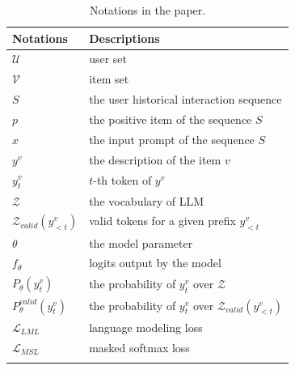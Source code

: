 \documentclass[sigconf,natbib=true]{acmart}
\begin{document}
\begin{table}[t]
    \centering
    \caption{Notations in the paper.}
    \begin{tabular}{ll}
    \toprule 
    \textbf{Notations}&\textbf{Descriptions}\\
    \midrule 
    $\mathcal{U}$ & user set \\
    $\mathcal{V}$ &  item set \\
    
    $S$ &  the user historical interaction sequence \\
    $p$ &  the positive item of the sequence $S$ \\
    $x$ &  the input prompt of the sequence $S$ \\
    $y^v$ &  the description of the item $v$ \\
    $y^v_t$ &  $t$-th token of $y^v$ \\

    $\mathcal{Z}$ &  the vocabulary of LLM \\
    $\mathcal{Z}_{valid}(y^v_{<t})$ & valid tokens for a given prefix $y^v_{<t}$ \\ 
    
    $\theta$ &  the model parameter \\
    $f_\theta$ &  logits output by the model \\
    $P_\theta(y^v_t)$ &  the probability of \( y^v_t \) over $\mathcal{Z}$ \\
    $P_\theta^{valid}(y^v_t)$ &  the probability of \( y^v_t \) over \( \mathcal{Z}_{valid}(y^v_{<t}) \) \\
    $\mathcal{L}_{LML}$ &  language modeling loss \\
    $\mathcal{L}_{MSL}$ &  masked softmax loss \\
    \bottomrule
    \label{notation}
    \end{tabular}
\end{table}
\end{document}
